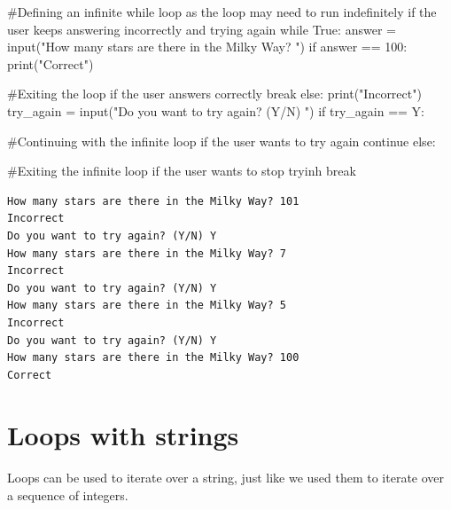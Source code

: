 \documentclass[
  letterpaper,
  DIV=11,
  numbers=noendperiod]{scrreprt}
\newenvironment{Shaded}{\begin{snugshade}}{\end{snugshade}}
\newcommand{\BuiltInTok}[1]{\textcolor[rgb]{0.00,0.23,0.31}{#1}}
\newcommand{\CommentTok}[1]{\textcolor[rgb]{0.37,0.37,0.37}{#1}}
\newcommand{\ControlFlowTok}[1]{\textcolor[rgb]{0.00,0.23,0.31}{#1}}
\newcommand{\NormalTok}[1]{\textcolor[rgb]{0.00,0.23,0.31}{#1}}
\newcommand{\OperatorTok}[1]{\textcolor[rgb]{0.37,0.37,0.37}{#1}}
\newcommand{\StringTok}[1]{\textcolor[rgb]{0.13,0.47,0.30}{#1}}
\newcommand{\VariableTok}[1]{\textcolor[rgb]{0.07,0.07,0.07}{#1}}
\begin{document}
\begin{Shaded}
\begin{Highlighting}[]
\CommentTok{\#Defining an infinite while loop as the loop may need to run indefinitely if the user keeps answering incorrectly and trying again}
\ControlFlowTok{while} \VariableTok{True}\NormalTok{:}
\NormalTok{    answer }\OperatorTok{=} \BuiltInTok{input}\NormalTok{(}\StringTok{"How many stars are there in the Milky Way? "}\NormalTok{)}
    \ControlFlowTok{if}\NormalTok{ answer }\OperatorTok{==} \StringTok{\textquotesingle{}100\textquotesingle{}}\NormalTok{:}
        \BuiltInTok{print}\NormalTok{(}\StringTok{"Correct"}\NormalTok{)}
        
        \CommentTok{\#Exiting the loop if the user answers correctly}
        \ControlFlowTok{break}
    \ControlFlowTok{else}\NormalTok{:}
        \BuiltInTok{print}\NormalTok{(}\StringTok{"Incorrect"}\NormalTok{)}
\NormalTok{        try\_again }\OperatorTok{=} \BuiltInTok{input}\NormalTok{(}\StringTok{"Do you want to try again? (Y/N) "}\NormalTok{)}
        \ControlFlowTok{if}\NormalTok{ try\_again }\OperatorTok{==} \StringTok{\textquotesingle{}Y\textquotesingle{}}\NormalTok{:}
            
            \CommentTok{\#Continuing with the infinite loop if the user wants to try again}
            \ControlFlowTok{continue}
        \ControlFlowTok{else}\NormalTok{:}
            
            \CommentTok{\#Exiting the infinite loop if the user wants to stop tryinh}
            \ControlFlowTok{break}
\end{Highlighting}
\end{Shaded}

\begin{verbatim}
How many stars are there in the Milky Way? 101
Incorrect
Do you want to try again? (Y/N) Y
How many stars are there in the Milky Way? 7
Incorrect
Do you want to try again? (Y/N) Y
How many stars are there in the Milky Way? 5
Incorrect
Do you want to try again? (Y/N) Y
How many stars are there in the Milky Way? 100
Correct
\end{verbatim}

\hypertarget{loops-with-strings}{%
\section{Loops with strings}\label{loops-with-strings}}

Loops can be used to iterate over a string, just like we used them to
iterate over a sequence of integers.
\end{document}
